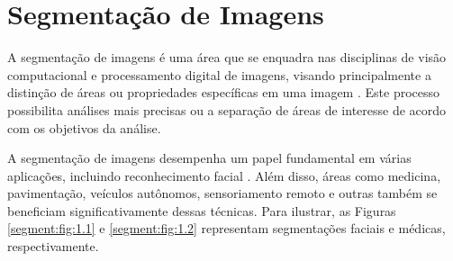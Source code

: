 \newpage
\clearpage
\section{Segmentação de Imagens}
\label{segment}

A segmentação de imagens é uma área que se enquadra nas disciplinas de visão computacional e processamento digital de imagens, visando principalmente a distinção de áreas ou propriedades específicas em uma imagem \citep{Haralick1985, Yuheng2017, Ghosh2019}. Este processo possibilita análises mais precisas ou a separação de áreas de interesse de acordo com os objetivos da análise.

A segmentação de imagens desempenha um papel fundamental em várias aplicações, incluindo reconhecimento facial \citep{Yuheng2017}. Além disso, áreas como medicina, pavimentação, veículos autônomos, sensoriamento remoto e outras também se beneficiam significativamente dessas técnicas. Para ilustrar, as Figuras \ref{segment:fig:1.1} e \ref{segment:fig:1.2} representam segmentações faciais e médicas, respectivamente.

